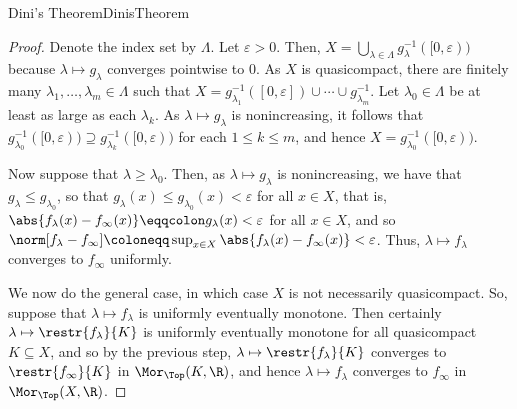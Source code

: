 \begin{prp}{Dini's Theorem}{DinisTheorem}
\begin{proof}
Denote the index set by $\Lambda$.  Let $\varepsilon >0$.  Then, $X=\bigcup _{\lambda \in \Lambda}g_{\lambda}^{-1}([0,\varepsilon ))$ because $\lambda \mapsto g_{\lambda}$ converges pointwise to $0$.  As $X$ is quasicompact, there are finitely many $\lambda _1,\ldots ,\lambda _m\in \Lambda$ such that $X=g_{\lambda _1}^{-1}([0,\varepsilon ])\cup \cdots \cup g_{\lambda _m}^{-1}$.  Let $\lambda _0\in \Lambda$ be at least as large as each $\lambda _k$.  As $\lambda \mapsto g_{\lambda}$ is nonincreasing, it follows that $g_{\lambda _0}^{-1}([0,\varepsilon ))\supseteq g_{\lambda _k}^{-1}([0,\varepsilon ))$ for each $1\leq k\leq m$, and hence $X=g_{\lambda _0}^{-1}([0,\varepsilon ))$.

Now suppose that $\lambda \geq \lambda _0$.  Then, as $\lambda \mapsto g_{\lambda}$ is nonincreasing, we have that $g_{\lambda}\leq g_{\lambda _0}$, so that $g_{\lambda}(x)\leq g_{\lambda _0}(x)<\varepsilon$ for all $x\in X$, that is, $\abs{f_{\lambda}(x)-f_{\infty}(x)}\eqqcolon g_{\lambda}(x)<\varepsilon$ for all $x\in X$, and so $\norm[f_{\lambda}-f_{\infty}]\coloneqq \sup _{x\in X}\abs{f_{\lambda}(x)-f_{\infty}(x)}<\varepsilon$.  Thus, $\lambda \mapsto f_{\lambda}$ converges to $f_{\infty}$ uniformly.

We now do the general case, in which case $X$ is not necessarily quasicompact.  So, suppose that $\lambda \mapsto f_{\lambda}$ is uniformly eventually monotone.  Then certainly $\lambda \mapsto \restr{f_{\lambda}}{K}$ is uniformly eventually monotone for all quasicompact $K\subseteq X$, and so by the previous step, $\lambda \mapsto \restr{f_{\lambda}}{K}$ converges to $\restr{f_{\infty}}{K}$ in $\Mor _{\Top}(K,\R )$, and hence $\lambda \mapsto f_{\lambda}$ converges to $f_{\infty}$ in $\Mor _{\Top}(X,\R )$.
\end{proof}
\end{prp}
